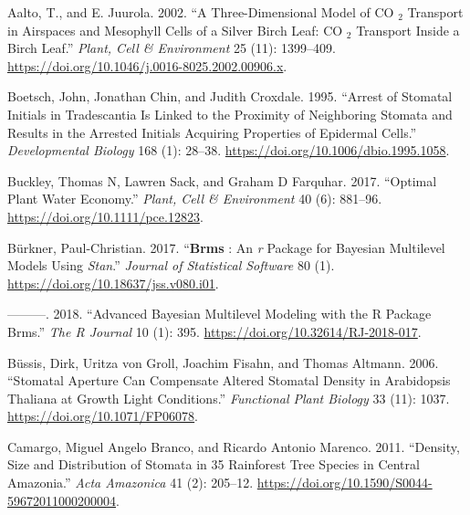 \documentclass[12pt,halfline,a4paper,]{ouparticle}
\newlength{\cslhangindent}
\newlength{\cslentryspacingunit} %
\newenvironment{CSLReferences}[2] %
 {%
  \setlength{\parindent}{0pt}
  \ifodd #1
  \let\oldpar\par
  \def\par{\hangindent=\cslhangindent\oldpar}
  \fi
  \setlength{\parskip}{#2\cslentryspacingunit}
 }%
 {}
\begin{document}
\hypertarget{refs}{}
\begin{CSLReferences}{1}{0}
\leavevmode{}%
Aalto, T., and E. Juurola. 2002. {``A Three-Dimensional Model of {CO}
\(_{\textrm{2}}\) Transport in Airspaces and Mesophyll Cells of a Silver
Birch Leaf: {CO} \(_{\textrm{2}}\) Transport Inside a Birch Leaf.''}
\emph{Plant, Cell \& Environment} 25 (11): 1399--409.
\url{https://doi.org/10.1046/j.0016-8025.2002.00906.x}.

\leavevmode{}%
Boetsch, John, Jonathan Chin, and Judith Croxdale. 1995. {``Arrest of
{Stomatal} {Initials} in {Tradescantia} {Is} {Linked} to the {Proximity}
of {Neighboring} {Stomata} and {Results} in the {Arrested} {Initials}
{Acquiring} {Properties} of {Epidermal} {Cells}.''} \emph{Developmental
Biology} 168 (1): 28--38. \url{https://doi.org/10.1006/dbio.1995.1058}.

\leavevmode{}%
Buckley, Thomas N, Lawren Sack, and Graham D Farquhar. 2017. {``Optimal
Plant Water Economy.''} \emph{Plant, Cell \& Environment} 40 (6):
881--96. \url{https://doi.org/10.1111/pce.12823}.

\leavevmode{}%
Bürkner, Paul-Christian. 2017. {``\textbf{Brms} : {An} \emph{r}
{Package} for {Bayesian} {Multilevel} {Models} {Using} \emph{Stan}.''}
\emph{Journal of Statistical Software} 80 (1).
\url{https://doi.org/10.18637/jss.v080.i01}.

\leavevmode{}%
---------. 2018. {``Advanced {Bayesian} {Multilevel} {Modeling} with the
{R} {Package} Brms.''} \emph{The R Journal} 10 (1): 395.
\url{https://doi.org/10.32614/RJ-2018-017}.

\leavevmode{}%
Büssis, Dirk, Uritza von Groll, Joachim Fisahn, and Thomas Altmann.
2006. {``Stomatal Aperture Can Compensate Altered Stomatal Density in
{Arabidopsis} Thaliana at Growth Light Conditions.''} \emph{Functional
Plant Biology} 33 (11): 1037. \url{https://doi.org/10.1071/FP06078}.

\leavevmode{}%
Camargo, Miguel Angelo Branco, and Ricardo Antonio Marenco. 2011.
{``Density, Size and Distribution of Stomata in 35 Rainforest Tree
Species in {Central} {Amazonia}.''} \emph{Acta Amazonica} 41 (2):
205--12. \url{https://doi.org/10.1590/S0044-59672011000200004}.


\end{CSLReferences}
\end{document}
